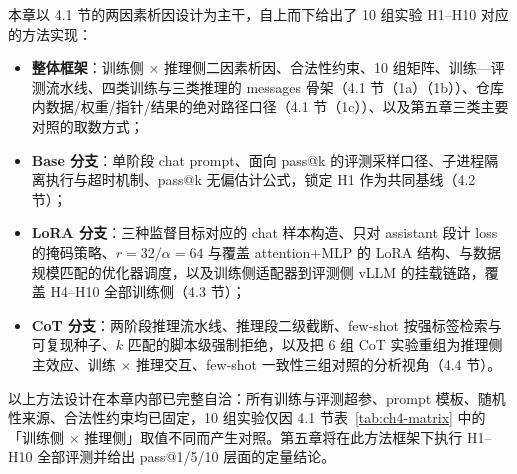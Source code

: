 
本章以 4.1 节的两因素析因设计为主干，自上而下给出了 10 组实验 H1--H10 对应的方法实现：
\begin{itemize}
    \item \textbf{整体框架}：训练侧 $\times$ 推理侧二因素析因、合法性约束、10 组矩阵、训练—评测流水线、四类训练与三类推理的 messages 骨架（4.1 节（1a）（1b））、仓库内数据/权重/指针/结果的绝对路径口径（4.1 节（1c））、以及第五章三类主要对照的取数方式；
    \item \textbf{Base 分支}：单阶段 chat prompt、面向 pass@k 的评测采样口径、子进程隔离执行与超时机制、pass@k 无偏估计公式，锁定 H1 作为共同基线（4.2 节）；
    \item \textbf{LoRA 分支}：三种监督目标对应的 chat 样本构造、只对 assistant 段计 loss 的掩码策略、$r{=}32/\alpha{=}64$ 与覆盖 attention+MLP 的 LoRA 结构、与数据规模匹配的优化器调度，以及训练侧适配器到评测侧 vLLM 的挂载链路，覆盖 H4--H10 全部训练侧（4.3 节）；
    \item \textbf{CoT 分支}：两阶段推理流水线、推理段二级截断、few-shot 按强标签检索与可复现种子、$k$ 匹配的脚本级强制拒绝，以及把 6 组 CoT 实验重组为推理侧主效应、训练 $\times$ 推理交互、few-shot 一致性三组对照的分析视角（4.4 节）。
\end{itemize}
以上方法设计在本章内部已完整自洽：所有训练与评测超参、prompt 模板、随机性来源、合法性约束均已固定，10 组实验仅因 4.1 节表~\ref{tab:ch4-matrix} 中的「训练侧 $\times$ 推理侧」取值不同而产生对照。第五章将在此方法框架下执行 H1--H10 全部评测并给出 pass@1/5/10 层面的定量结论。